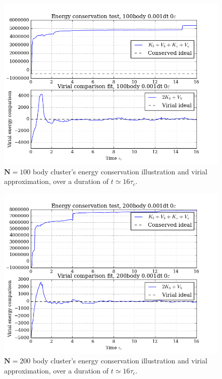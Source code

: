 \documentclass[11pt,a4paper,notitlepage,twocolumn]{article}
\begin{document}
\begin{figure}
[H]\center
\includegraphics[scale=0.35]{../figs/ClusterEnConsvVirial_100body_dt1_eps0_dur16.png}
\caption{$\mathbf{N} = 100$ body cluster's energy conservation illustration and virial approximation, over a duration of $t \simeq 16\tau_c$.}\label{fig:N100eps0consVirial}
\end{figure}
\begin{figure}
[H]\center
\includegraphics[scale=0.35]{../figs/ClusterEnConsvVirial_200body_dt1_eps0_dur16.png}
\caption{$\mathbf{N} = 200$ body cluster's energy conservation illustration and virial approximation, over a duration of $t \simeq 16\tau_c$.}
\label{fig:N200eps0consVirial}
\end{figure}
\end{document}
